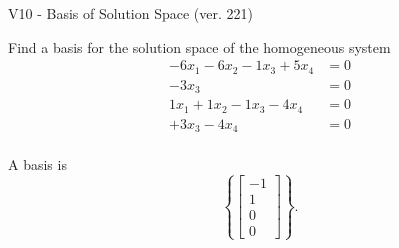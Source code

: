 \begin{exercise}
  \begin{exerciseTitle}V10 - Basis of Solution Space (ver. 221)\end{exerciseTitle}
  \begin{exerciseStatement}
    Find a basis for the solution space of the homogeneous system 
\begin{align*}
 -6 x_ 1 -6 x_ 2 -1 x_ 3 + 5 x_ 4 &= 0  \\ 
  -3 x_ 3 &= 0  \\ 
  1 x_ 1 + 1 x_ 2 -1 x_ 3 -4 x_ 4 &= 0  \\ 
  + 3 x_ 3 -4 x_ 4 &= 0  \\ 
 \end{align*}


 
  \end{exerciseStatement}

  \begin{exerciseAnswer}
   A basis is   
\[\left\{\left[\begin{array}{c}
-1 \\
1 \\
0 \\
0
\end{array}\right]\right\}.\]

  


  \end{exerciseAnswer}
\end{exercise}